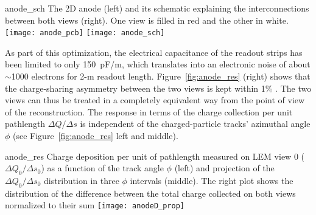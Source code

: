 \begin{cdrfigure}{anode_sch}
{The 2D anode (left) and its schematic explaining the  interconnections 
between both views (right). One view is filled  in red and the other in white.}
\texttt{[image: anode\_pcb]} \hspace{0.2cm} \texttt{[image: anode\_sch]}
\end{cdrfigure}

As part of this optimization, the electrical capacitance of the
readout strips has been limited to only 150~pF/m, which translates
into an electronic noise of about $\sim$1000 electrons for 2-m readout
length.  Figure~\ref{fig:anode_res} (right) shows that the charge-sharing 
asymmetry between the two views is kept within 1\% . The two views can thus
be treated in a completely equivalent way from the
point of view of the reconstruction. The response in terms of the
charge collection per unit pathlength $\Delta Q/\Delta s$ is
independent of the charged-particle tracks' azimuthal angle $\phi$ (see
Figure~\ref{fig:anode_res} left and middle).
\begin{cdrfigure}{anode_res}
{Charge deposition per unit of pathlength measured on LEM view 0 
($\Delta Q_0/\Delta s_0$) as a function  of the track angle $\phi$ (left) and 
projection of the  $\Delta Q_0/\Delta s_0$ distribution in three $\phi$ intervals (middle). 
The right plot  shows the distribution of the difference between the total charge  collected 
on both views normalized to their sum}
\texttt{[image: anodeD\_prop]}
\end{cdrfigure}

